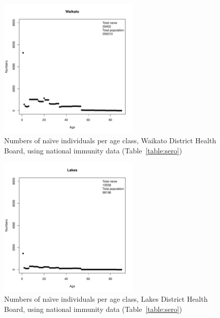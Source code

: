 \documentclass{article}
\begin{document}
\begin{itemize}
\begin{figure}[H]
     \begin{center}
     \includegraphics[width=0.6\textwidth]{dhb5.pdf}
     \end{center}
     \caption{Numbers of na\"{\i}ve individuals per age class, Waikato District Health Board, using national immunity data (Table~\ref{table:sero})}
     \label{fig:Waikato}
\end{figure}

\begin{figure}[H]
     \begin{center}
     \includegraphics[width=0.6\textwidth]{dhb6.pdf}
     \end{center}
     \caption{Numbers of na\"{\i}ve individuals per age class, Lakes District Health Board, using national immunity data (Table~\ref{table:sero})}
     \label{fig:Lakes}
\end{figure}


\end{itemize}
\end{document}
